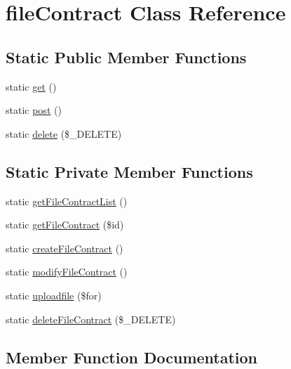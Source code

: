 \hypertarget{classfile_contract}{}\section{file\+Contract Class Reference}
\label{classfile_contract}
\subsection*{Static Public Member Functions}
\begin{DoxyCompactItemize}
\item 
static \hyperlink{classfile_contract_a5ba61361bf0695a285bbaefefc427191}{get} ()
\item 
static \hyperlink{classfile_contract_a68f2acd1041d57bf8faf2da612e202a8}{post} ()
\item 
static \hyperlink{classfile_contract_a598da63ff0199f442adaa4dfb0fe1447}{delete} (\$\+\_\+\+D\+E\+L\+E\+T\+E)
\end{DoxyCompactItemize}
\subsection*{Static Private Member Functions}
\begin{DoxyCompactItemize}
\item 
static \hyperlink{classfile_contract_a6ee760cc2ff8396f6872ea2aa381c970}{get\+File\+Contract\+List} ()
\item 
static \hyperlink{classfile_contract_a0ea4c639102d0fd40b3f5a93f2aaf3b4}{get\+File\+Contract} (\$id)
\item 
static \hyperlink{classfile_contract_a6a978b954271c3719e7edd6311cda159}{create\+File\+Contract} ()
\item 
static \hyperlink{classfile_contract_af2cac22b441b824a3336528fada0144f}{modify\+File\+Contract} ()
\item 
static \hyperlink{classfile_contract_a88dccfeb88796efbe02090e07e755e17}{uploadfile} (\$for)
\item 
static \hyperlink{classfile_contract_a59b1222816aff91a512c82aefb93c0cf}{delete\+File\+Contract} (\$\+\_\+\+D\+E\+L\+E\+T\+E)
\end{DoxyCompactItemize}


\subsection{Member Function Documentation}
\hypertarget{classfile_contract_a5ba61361bf0695a285bbaefefc427191}{}
